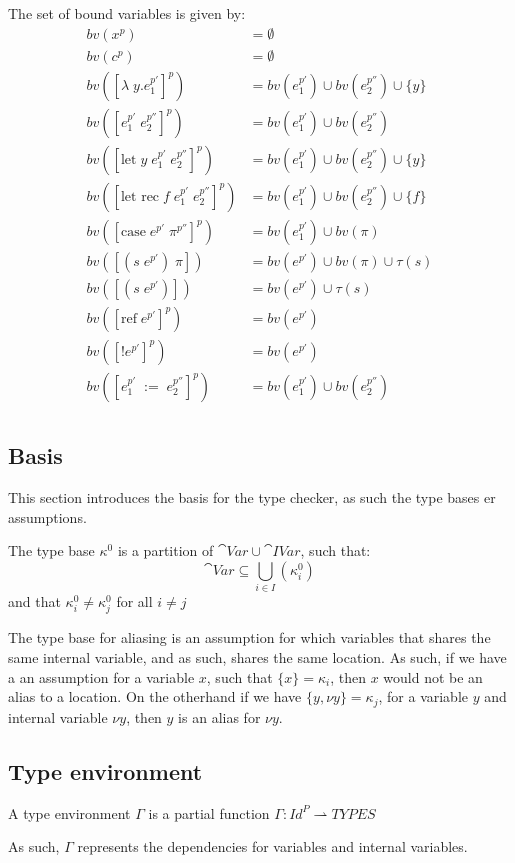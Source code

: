 \documentclass[../../master.tex]{subfiles}
\begin{document}
\begin{definition}
	The set of bound variables is given by:
	\begin{align*}
		bv(x^p)&=\emptyset\\
		bv(c^p)&=\emptyset\\
		bv([\lambda\;y.e_1^{p'}]^p)&=bv(e_1^{p'})\cup bv(e_2^{p''})\cup\{y\}\\
		bv([e_1^{p'}\;e_2^{p''}]^p)&=bv(e_1^{p'})\cup bv(e_2^{p''})\\
		bv([\mbox{let}\;y\;e_1^{p'}\;e_2^{p''}]^p)&=bv(e_1^{p'})\cup bv(e_2^{p''})\cup\{y\}\\
		bv([\mbox{let rec}\;f\;e_1^{p'}\;e_2^{p''}]^p)&=bv(e_1^{p'})\cup bv(e_2^{p''})\cup\{f\}\\
		bv([\mbox{case}\;e^{p'}\;\pi^{p''}]^p)&=bv(e_1^{p'})\cup bv(\pi)\\
		bv([(s\;e^{p'})\;\pi])&=bv(e^{p'})\cup bv(\pi)\cup\tau(s)\\
		bv([(s\;e^{p'})])&=bv(e^{p'})\cup\tau(s)\\
		bv([\mbox{ref}\;e^{p'}]^p)&=bv(e^{p'})\\
		bv([!e^{p'}]^p)&=bv(e^{p'})\\
		bv([e_1^{p'}\;:=\;e_2^{p''}]^p)&=bv(e_1^{p'})\cup bv(e_2^{p''})\\
	\end{align*}
\end{definition}


\subsection{Basis}
This section introduces the basis for the type checker, as such the type bases er assumptions.
\begin{definition}
	The type base $\kappa^0$ is a partition of $\cat{Var}\cup\cat{IVar}$, such that:
	$$\cat{Var}\subseteq\bigcup_{i\in I}(\kappa_i^0)$$
	and that $\kappa_i^0\neq\kappa_j^0$ for all $i\neq j$
\end{definition}
The type base for aliasing is an assumption for which variables that shares the same internal variable, and as such, shares the same location.
As such, if we have a an assumption for a variable $x$, such that $\{x\}=\kappa_i$, then $x$ would not be an alias to a location.
On the otherhand if we have $\{y,\nu y\}=\kappa_j$, for a variable $y$ and internal variable $\nu y$, then $y$ is an alias for $\nu y$.

\subsection{Type environment}
\begin{definition}
	A type environment $\Gamma$ is a partial function $\Gamma:Id^P\rightharpoonup TYPES$
\end{definition}
As such, $\Gamma$ represents the dependencies for variables and internal variables.
\end{document}
